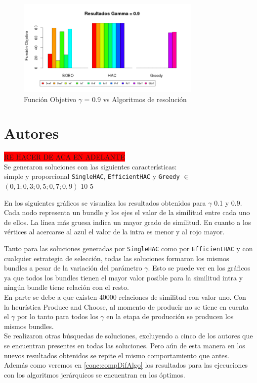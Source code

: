 \begin{figure}[H]
  \centering
    \includegraphics[width=0.8\textwidth]{resultados/papers/Graficos_agrupados/gamma09.png}
  \caption{Función Objetivo $\gamma$ = $0.9$ vs Algoritmos de resolución}
  \label{res:img-papers-agr-gamma09}
\end{figure}

\section{Autores}
\colorbox{red}{RE HACER DE ACA EN ADELANTE}\\
Se generaron soluciones con las siguientes características:\\
\Solucion
{}
{simple y proporcional}
{\texttt{SingleHAC}, \texttt{EfficientHAC} y \texttt{Greedy}}
{$\in$ $(0,1; 0,3; 0,5; 0,7; 0,9)$}
{10}
{5}

En los siguientes gráficos se visualiza los resultados obtenidos para $\gamma$ 0.1 y 0.9. Cada 
nodo representa un bundle y los ejes el valor de la similitud entre cada uno de ellos. La línea más 
gruesa indica un mayor grado de similitud. En cuanto a los vértices al acercarse al azul el valor 
de la intra es menor y al rojo mayor.


Tanto para las soluciones generadas por \texttt{SingleHAC} como por \texttt{EfficientHAC} y con 
cualquier estrategia de selección, todas las soluciones formaron los mismos bundles a pesar de la 
variación del parámetro $\gamma$. Esto se puede ver en los gráficos ya que todos los bundles 
tienen el mayor valor posible para la similitud intra y ningún bundle tiene relación con el 
resto.\\
En parte se debe a que existen $40000$ relaciones de similitud con valor uno. Con la 
heurística Produce and Choose, al momento de producir no se tiene en cuenta el $\gamma$ por lo tanto 
para todos los $\gamma$ en la etapa de producción se producen los mismos bundles.\\
Se realizaron otras búsquedas de soluciones, excluyendo a cinco de los autores que se encuentran 
presentes en todas las soluciones. Pero aún de esta manera en los nuevos resultados obtenidos se 
repite el mismo comportamiento que antes.\\
Además como veremos en \ref{conc:compDifAlgo} los resultados para las ejecuciones con los 
algoritmos jerárquicos se encuentran en los óptimos.

